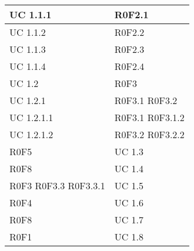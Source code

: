 \begin{center}
\begin{longtable}{| p{4cm} | p{4cm} |}
		\hline
		UC 1.1.1  &  R0F2.1 \\
		\hline
		UC 1.1.2  &  R0F2.2\\
		\hline
		UC 1.1.3  &  R0F2.3 \\
		\hline
		UC 1.1.4  &  R0F2.4 \\
		\hline
		UC 1.2   &  R0F3 \\
		\hline
		UC 1.2.1  &  R0F3.1 \newline R0F3.2 \\
		\hline
		UC 1.2.1.1 &  R0F3.1 \newline R0F3.1.2 \\
		\hline
		UC 1.2.1.2 &  R0F3.2 \newline R0F3.2.2 \\
		\hline

		R0F5  &  UC 1.3 \\
		\hline
		R0F8  &  UC 1.4 \\
		\hline
		R0F3 R0F3.3 R0F3.3.1 &  UC 1.5 \\
		\hline
		R0F4  &  UC 1.6 \\
		\hline
		R0F8  &  UC 1.7 \\
		\hline
		R0F1  & UC 1.8 \\
		\hline

	\end{longtable}
	\egroup
	\end{center}

	





